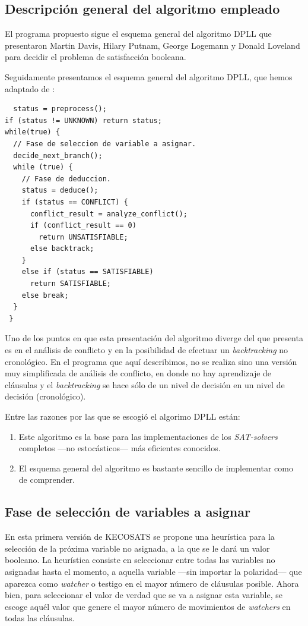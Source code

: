 \documentclass[12pt,lettersize,oneside]{article}
\begin{document}
\subsection{Descripción general del algoritmo empleado}
El programa propuesto sigue el esquema general del algoritmo DPLL que presentaron
Martin Davis, Hilary Putnam, George Logemann y Donald Loveland para decidir el
problema de satisfacción booleana.

Seguidamente presentamos el esquema general del algoritmo DPLL, que hemos
adaptado de \cite{Zhang}:

\begin{lstlisting}
  status = preprocess(); 
if (status != UNKNOWN) return status; 
while(true) { 
  // Fase de seleccion de variable a asignar.
  decide_next_branch(); 
  while (true) { 
    // Fase de deduccion.
    status = deduce(); 
    if (status == CONFLICT) { 
      conflict_result = analyze_conflict(); 
      if (conflict_result == 0) 
        return UNSATISFIABLE; 
      else backtrack; 
    } 
    else if (status == SATISFIABLE) 
      return SATISFIABLE; 
    else break; 
  } 
 } 
\end{lstlisting}
\vspace{-2.5mm}

Uno de los puntos en que esta presentación del algoritmo diverge del que
presenta \cite{Zhang} es en el análisis de conflicto y en la posibilidad de
efectuar un \emph{backtracking} no cronológico. En el programa que aquí
describimos, no se realiza sino una versión muy simplificada de análisis de
conflicto, en donde no hay aprendizaje de cláusulas y el \emph{backtracking} se
hace sólo de un nivel de decisión en un nivel de decisión (cronológico).

Entre las razones por las que se escogió el algorimo DPLL están:
\begin{enumerate}
\item Este algoritmo es la base para las implementaciones de los
  \emph{SAT-solvers} completos ---no estocásticos--- más eficientes conocidos.
\item El esquema general del algoritmo es bastante sencillo de implementar como
  de comprender.
\end{enumerate}
\subsection{Fase de selección de variables a asignar}\label{ProxVariable}

En esta primera versión de KECOSATS se propone una heurística para la selección
de la próxima variable no asignada, a la que se le dará un valor booleano. La
heurística consiste en seleccionar entre todas las variables no asignadas hasta
el momento, a aquella variable ---sin importar la polaridad--- que aparezca como
\emph{watcher} o testigo en el mayor número de cláusulas posible. Ahora bien,
para seleccionar el valor de verdad que se va a asignar esta variable, se escoge
aquél valor que genere el mayor número de movimientos de \emph{watchers} en
todas las cláusulas.
\end{document}

